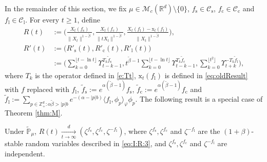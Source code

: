 \documentclass{amse-new}
\numberwithin{equation}{section}
\begin{document}
	In the remainder of this section, we  fix $\mu \in \mathcal M_c(\mathbb R^d)\setminus\{0\}$, $f_\mathrm s\in \mathcal C_\mathrm s$,  $f_\mathrm c\in \mathcal C_\mathrm c$ and $f_\mathrm l\in \mathcal C_\mathrm l$.
	For every $t\geq 1$, define
\begin{align}
	R(t)
	&:=\Big( \frac{X_t(f_\mathrm s)}{\|X_t\|^{1-\tilde \beta}},\frac{X_t(f_\mathrm c)}{\|tX_t\|^{1-\tilde \beta}},\frac{ X_t(f_\mathrm l) - \mathrm x_t(f_\mathrm l)}{\|X_t\|^{1-\tilde \beta}}\Big),
        \\R'(t)
    &:=\big(R'_\mathrm s(t), R'_\mathrm c(t), R'_\mathrm l(t)\big)
        \\& :=\Big(\sum_{k=0}^{\lfloor t-\ln t \rfloor} \Upsilon_{t-k-1}^{T_k \tilde f_\mathrm s},t^{\tilde \beta - 1}\sum_{k=0}^{\lfloor t-\ln t \rfloor} \Upsilon_{t-k-1}^{T_{k} \tilde f_\mathrm c},\sum_{k = 0}^{\lfloor t^2 \rfloor} \Upsilon_{t+k}^{- T_k \tilde f_\mathrm l}\Big),
\end{align}
where $T_k$ is the operator defined in
\eqref{e:Tt}, $\mathrm x_t(f_\mathrm l)$ is defined in \eqref{eq:oldResult}
with $f$ replaced with $f_\mathrm l$, $\tilde f_\mathrm s:=e^{\alpha(\tilde \beta - 1)} f_\mathrm s$, $\tilde f_\mathrm c:=e^{\alpha(\tilde \beta - 1)} f_\mathrm c$ and $\tilde f_\mathrm l := \sum_{p\in \mathbb Z^d_+: \alpha\tilde\beta>|p|b}e^{-(\alpha - |p|b)}\langle f_\mathrm l, \phi_p \rangle_\varphi \phi_p$.
	The following result is a special case of Theorem \ref{thm:M}.
\begin{theorem}\label{thm: II}
	Under $\mathbb{\widetilde{P}}_{\mu}$, $R(t) \xrightarrow[t\rightarrow\infty]{d}(\zeta^{f_\mathrm s},\zeta^{f_\mathrm c},\zeta^{-f_\mathrm l})$, where $\zeta^{f_\mathrm s},\zeta^{f_\mathrm c}$ and $\zeta^{-f_\mathrm l}$ are the $(1+\beta)$-stable random variables described in \eqref{eq:I:R:3}, and $\zeta^{f_\mathrm s},\zeta^{f_\mathrm c}$ and $\zeta^{-f_\mathrm l}$ are independent.
\end{theorem}
\end{document}
